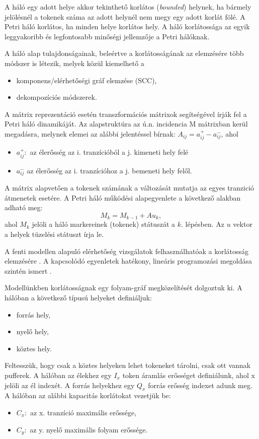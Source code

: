 
A háló egy adott helye akkor tekinthető korlátos (\textit{bounded}) helynek, ha bármely jelölésnél a tokenek száma az adott helynél nem megy egy adott korlát fölé. A Petri háló korlátos, ha minden helye korlátos hely.
A háló korlátossága az egyik leggyakoribb és legfontosabb minőségi jellemzője a Petri hálóknak. 

A háló alap tulajdonságainak, beleértve a korlátosságának az elemzésére több módszer is létezik, melyek közül kiemelhető a
\begin{itemize}
\item komponens/elérhetőségi gráf elemzése (SCC),
\item dekompozíciós módszerek.
\end{itemize}

A mátrix reprezentáció esetén transzformációs mátrixok segítségével írják fel a Petri háló dinamikáját. Az alapstruktúra az ú.n. incidencia M mátrixban kerül megadásra, melynek elemei az alábbi jelentéssel bírnak: $A_{ij}=a^+_{ij}-a^-_{ij}$, ahol 
\begin{itemize}
\item $a^+_{ij}: $ az élerősség az i. tranzícióból a j. kimeneti hely felé
\item $a^-_{ij}$ az élerősség az i. tranzícióhoz a j. bemeneti hely felől.
\end{itemize}

A mátrix alapvetően a tokenek számának a változását mutatja az egyes tranzició átmenetek esetére. A  Petri háló működési alapegyenlete a következő alakban adható meg: 
$$M_k=M_{k-1}+ Au_k,$$
ahol $M_k$ jelöli a háló markereinek (tokenek) státuszát a $k.$ lépésben. Az $u$ vektor a helyek tüzelési státuszt írja le. 

A fenti modellen alapuló elérhetőség vizsgálatok felhasználhatóak a korlátosság elemzésére \cite{murata1989petri}.
A kapcsolódó  egyenletek hatékony, lineáris programozási megoldása szintén ismert \cite{lasserre1989using}.


Modellünkben korlátosságnak egy folyam-gráf megközelítését dolgoztuk ki.  A hálóban a következő típusú helyeket definiáljuk:
\begin{itemize}
\item forrás hely,
\item nyelő hely,
\item köztes hely.
\end{itemize}
Feltesszük, hogy csak a köztes helyeken lehet tokeneket tárolni, csak ott vannak pufferek. A hálóban az élekhez egy $I_x$ token áramlás erősséget definiálunk, ahol x jelöli az él indexét. A forrás helyekhez egy $Q_x$ forrás erősség indexet adunk meg. A hálóban az alábbi kapacitás korlátokat vezetjük be:
\begin{itemize}
\item $C_x:$ az x. tranzíció maximális erőssége,
\item $C_y:$ az y. nyelő maximális folyam erőssége.
\end{itemize}

